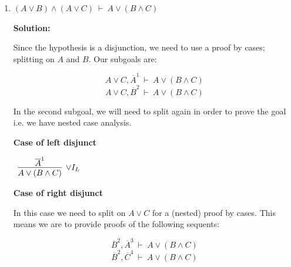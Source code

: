 \documentclass[11pt]{report}
\newcommand{\temp}[2]{{\overline{#2}}^{#1}}
\begin{document}
\begin{enumerate}
\begin{enumerate}
		These subproofs come together with $\lor$-elimination to complete the proof.

		\begin{scriptsize}
			\begin{center}
				$\begin{array}{c}
					\infer[\lor E]{(A \lor B) \land (A \lor C)}
						{A \lor (B \land C)
						&
						\infer[\to I, 1]{A \to (A \lor B) \land (A \lor C)}
							{\infer[\land I]{(A \lor B) \land (A \lor C)}
								{\infer[\lor I_{L}]{A \lor B}{\temp{1}{A}}
								&
								\infer[\lor I_{L}]{A \lor C}{\temp{1}{A}}}}
						&
						\infer[\to I, 2]{(B \land C) \to (A \lor B) \land (A \lor C)}
							{\infer[\land I]{(A \lor B) \land (A \lor C)}
								{\infer[\lor I_{R}]{A \lor B}
									{\infer[\land E_{L}]{B}{\temp{2}{B \land C}}}
								&
								\infer[\lor I_{R}]{A \lor C}
									{\infer[\land E_{R}]{C}{\temp{2}{B \land C}}}}}}
				\end{array}$
			\end{center}
		\end{scriptsize}
		
		\newpage
		\item $(A \lor B) \land (A \lor C) \ \vdash \ A \lor (B \land C)$
		
		\textbf{Solution:}

		Since the hypothesis is a disjunction, we need to use a proof by cases; splitting on $A$ and $B$. Our subgoals are: 

		$$A \lor C, \temp{1}{A} \ \vdash \ A \lor (B \land C) $$
		$$A \lor C, \temp{2}{B} \ \vdash \ A \lor (B \land C) $$

		In the second subgoal, we will need to split again in order to prove the goal i.e. we have nested case analysis. 

		\textbf{Case of left disjunct}

		\begin{center}
			$\begin{array}{c}
				\infer[\lor I_{L}]{A \lor (B \land C)}
					{\temp{1}{A}}
			\end{array}$
		\end{center}

		\textbf{Case of right disjunct}

		In this case we need to split on $A \lor C$ for a (nested) proof by cases. This means we are to provide proofs of the following sequents: 

		$$\temp{2}{B}, \temp{3}{A} \ \vdash \ A \lor (B \land C) $$
		$$\temp{2}{B}, \temp{4}{C} \ \vdash \ A \lor (B \land C) $$


\end{enumerate}
\end{enumerate}
\end{document}

